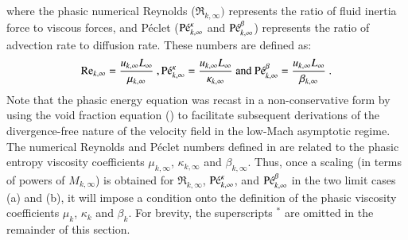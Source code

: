\documentclass[preprint,10pt]{elsarticle}
\begin{document}
%
where the phasic numerical Reynolds ($\Re_{k,\infty})$ represents the ratio of fluid inertia force to viscous forces, and P\'eclet ($\textrm{P\'e}_{k,\infty}^\kappa$ and $\textrm{P\'e}_{k,\infty}^\beta$) represents the ratio of advection rate to diffusion rate. These numbers are defined as:
%
\begin{equation}
\label{eq:ref_numb}
\Re_{k,\infty} = \frac{u_{k,\infty} L_\infty}{\mu_{k,\infty}} \ ,
\Pe_{k,\infty}^\kappa = \frac{u_{k,\infty} L_\infty}{\kappa_{k,\infty}} \text{ and }
\Pe_{k,\infty}^\beta = \frac{u_{k,\infty} L_\infty}{\beta_{k,\infty}} \ .
\end{equation}
%
Note that the phasic energy equation was recast in a non-conservative form by using the void fraction equation () to facilitate subsequent derivations of the divergence-free nature of the velocity field in the low-Mach asymptotic regime.
The numerical Reynolds and P\'eclet numbers defined in  are related to the phasic entropy 
viscosity coefficients $\mu_{k,\infty}$, $\kappa_{k,\infty}$ and $\beta_{k,\infty}$. Thus, once a scaling (in terms of powers of $M_{k,\infty}$) 
is obtained for $\Re_{k,\infty}$, $\textrm{P\'e}_{k,\infty}^\kappa$, and $\textrm{P\'e}_{k,\infty}^\beta$ in the two limit cases (a) and (b), it will impose a condition onto the definition of the phasic viscosity coefficients $\mu_k$, $\kappa_k$ and $\beta_k$. For brevity, the superscripts $^*$ are omitted in the remainder of this section. 

\end{document}
